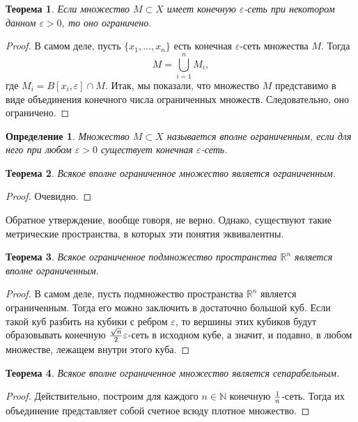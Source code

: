 \documentclass{article}
\newtheorem{theorem}{Теорема}[section]
\newtheorem{definition}{Определение}[section]
\begin{document}
\begin{theorem}
Если множество \(M \subset X\) имеет конечную \(\varepsilon\)-сеть при некотором данном \(\varepsilon > 0\), то оно ограничено.
\end{theorem}

\begin{proof}
В самом деле, пусть \(\{x_1, ..., x_n\}\) есть конечная \(\varepsilon\)-сеть множества \(M\). Тогда
\[
M = \bigcup\limits_{i=1}^{n}M_i,
\]
где \(M_i = B[x_i, \varepsilon] \cap M\). Итак, мы показали, что множество \(M\) представимо в виде объединения конечного числа ограниченных множеств. Следовательно, оно ограничено.
\end{proof}

\begin{definition}
Множество \(M \subset X\) называется вполне ограниченным, если для него при любом \(\varepsilon > 0\) существует конечная \(\varepsilon\)-сеть.
\end{definition}

\begin{theorem}
Всякое вполне ограниченное множество является ограниченным.
\end{theorem}

\begin{proof}
Очевидно.
\end{proof}

Обратное утверждение, вообще говоря, не верно. Однако, существуют такие метрические пространства, в которых эти понятия эквивалентны.

\begin{theorem}
Всякое ограниченное подмножество пространства \(\mathbb{R}^n\) является вполне ограниченным.
\end{theorem}

\begin{proof}
В самом деле, пусть подмножество пространства \(\mathbb{R}^n\) является ограниченным. Тогда его можно заключить в достаточно большой куб. Если такой куб разбить на кубики с ребром \(\varepsilon\), то вершины этих кубиков будут образовывать конечную \({\sqrt{n} \over 2}\varepsilon\)-сеть в исходном кубе, а значит, и подавно, в любом множестве, лежащем внутри этого куба.
\end{proof}

\begin{theorem}
Всякое вполне ограниченное множество является сепарабельным.
\end{theorem}

\begin{proof}
Действительно, построим для каждого \(n \in \mathbb{N}\) конечную \({1 \over n}\)-сеть. Тогда их объединение представляет собой счетное всюду плотное множество.
\end{proof}
\end{document}
